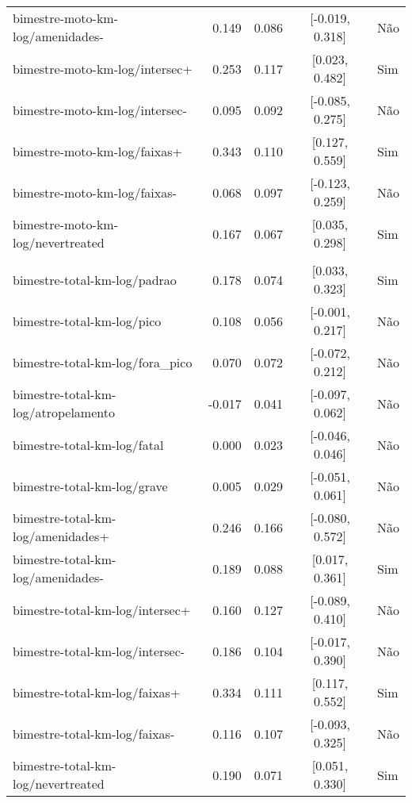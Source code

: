 \begin{longtable}{lrrcl}
bimestre-moto-km-log/amenidades- & 0.149 & 0.086 & {}[-0.019, 0.318] & Não\\
bimestre-moto-km-log/intersec+ & 0.253 & 0.117 & {}[0.023, 0.482] & Sim\\
bimestre-moto-km-log/intersec- & 0.095 & 0.092 & {}[-0.085, 0.275] & Não\\
bimestre-moto-km-log/faixas+ & 0.343 & 0.110 & {}[0.127, 0.559] & Sim\\
bimestre-moto-km-log/faixas- & 0.068 & 0.097 & {}[-0.123, 0.259] & Não\\
bimestre-moto-km-log/nevertreated & 0.167 & 0.067 & {}[0.035, 0.298] & Sim\\
 &  &  &  & \\
bimestre-total-km-log/padrao & 0.178 & 0.074 & {}[0.033, 0.323] & Sim\\
bimestre-total-km-log/pico & 0.108 & 0.056 & {}[-0.001, 0.217] & Não\\
bimestre-total-km-log/fora\_pico & 0.070 & 0.072 & {}[-0.072, 0.212] & Não\\
bimestre-total-km-log/atropelamento & -0.017 & 0.041 & {}[-0.097, 0.062] & Não\\
bimestre-total-km-log/fatal & 0.000 & 0.023 & {}[-0.046, 0.046] & Não\\
bimestre-total-km-log/grave & 0.005 & 0.029 & {}[-0.051, 0.061] & Não\\
bimestre-total-km-log/amenidades+ & 0.246 & 0.166 & {}[-0.080, 0.572] & Não\\
bimestre-total-km-log/amenidades- & 0.189 & 0.088 & {}[0.017, 0.361] & Sim\\
bimestre-total-km-log/intersec+ & 0.160 & 0.127 & {}[-0.089, 0.410] & Não\\
bimestre-total-km-log/intersec- & 0.186 & 0.104 & {}[-0.017, 0.390] & Não\\
bimestre-total-km-log/faixas+ & 0.334 & 0.111 & {}[0.117, 0.552] & Sim\\
bimestre-total-km-log/faixas- & 0.116 & 0.107 & {}[-0.093, 0.325] & Não\\
bimestre-total-km-log/nevertreated & 0.190 & 0.071 & {}[0.051, 0.330] & Sim\\*
\end{longtable}
